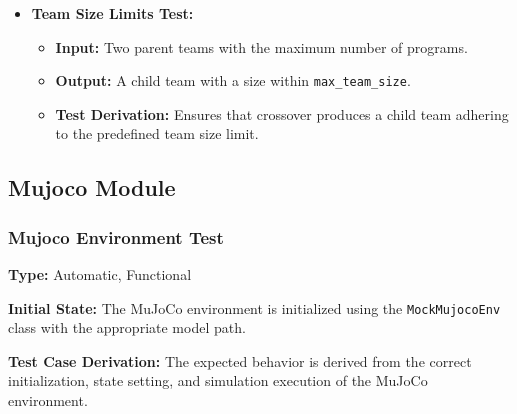 \documentclass[12pt, titlepage]{article}
\begin{document}
\begin{itemize}
    \item \textbf{Team Size Limits Test:}
    \begin{itemize}
        \item \textbf{Input:} Two parent teams with the maximum number of programs.
        \item \textbf{Output:} A child team with a size within \texttt{max\_team\_size}.
        \item \textbf{Test Derivation:} Ensures that crossover produces a child team adhering to the predefined team size limit.
    \end{itemize}
\end{itemize}



\subsection{Mujoco Module}

\subsubsection{Mujoco Environment Test\\}


\textbf{Type:} Automatic, Functional

\textbf{Initial State:} The MuJoCo environment is initialized using the \texttt{MockMujocoEnv} class with the appropriate model path.

\textbf{Test Case Derivation:} The expected behavior is derived from the correct initialization, state setting, and simulation execution of the MuJoCo environment.
\end{document}
